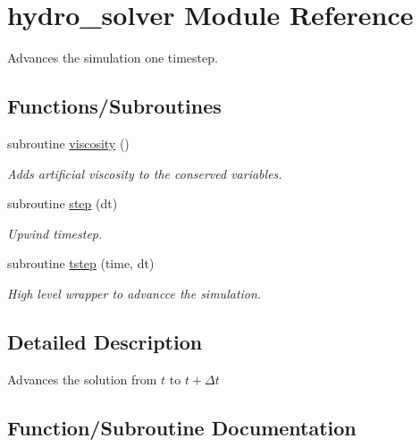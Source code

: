 \hypertarget{namespacehydro__solver}{}\section{hydro\+\_\+solver Module Reference}
\label{namespacehydro__solver}


Advances the simulation one timestep.  


\subsection*{Functions/\+Subroutines}
\begin{DoxyCompactItemize}
\item 
subroutine \hyperlink{namespacehydro__solver_a88127baf969063d6d9a31845fa7c1835}{viscosity} ()
\begin{DoxyCompactList}\small\item\em Adds artificial viscosity to the conserved variables. \end{DoxyCompactList}\item 
subroutine \hyperlink{namespacehydro__solver_ac34a166e9ddd81f20f2b271138458a1a}{step} (dt)
\begin{DoxyCompactList}\small\item\em Upwind timestep. \end{DoxyCompactList}\item 
subroutine \hyperlink{namespacehydro__solver_aca1a384e66d388e79ca981c0c84680a0}{tstep} (time, dt)
\begin{DoxyCompactList}\small\item\em High level wrapper to advancce the simulation. \end{DoxyCompactList}\end{DoxyCompactItemize}


\subsection{Detailed Description}
Advances the solution from $ t $ to $ t + \Delta t $ 

\subsection{Function/\+Subroutine Documentation}
\hypertarget{namespacehydro__solver_ac34a166e9ddd81f20f2b271138458a1a}{}
